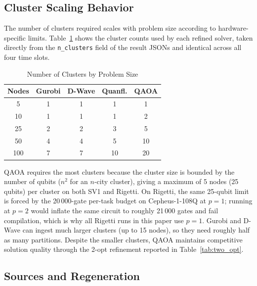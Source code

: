 \documentclass[conference]{IEEEtran}
\begin{document}
\subsection{Cluster Scaling Behavior}

The number of clusters required scales with problem size according to hardware-specific limits. Table~\ref{tab:clusters} shows the cluster counts used by each refined solver, taken directly from the \texttt{n\_clusters} field of the result JSONs and identical across all four time slots.

\begin{table}[htbp]
\caption{Number of Clusters by Problem Size}
\begin{center}
\begin{tabular}{|c|c|c|c|c|}
\hline
\textbf{Nodes} & \textbf{Gurobi} & \textbf{D-Wave} & \textbf{Quanfl.} & \textbf{QAOA} \\
\hline
5   & 1 & 1 & 1  & 1  \\
\hline
10  & 1 & 1 & 1  & 2  \\
\hline
25  & 2 & 2 & 3  & 5  \\
\hline
50  & 4 & 4 & 5  & 10 \\
\hline
100 & 7 & 7 & 10 & 20 \\
\hline
\end{tabular}
\label{tab:clusters}
\end{center}
\end{table}

QAOA requires the most clusters because the cluster size is bounded by the number of qubits ($n^2$ for an $n$-city cluster), giving a maximum of 5 nodes (25 qubits) per cluster on both SV1 and Rigetti. On Rigetti, the same 25-qubit limit is forced by the 20\,000-gate per-task budget on Cepheus-1-108Q at $p=1$; running at $p=2$ would inflate the same circuit to roughly 21\,000 gates and fail compilation, which is why all Rigetti runs in this paper use $p=1$. Gurobi and D-Wave can ingest much larger clusters (up to 15 nodes), so they need roughly half as many partitions. Despite the smaller clusters, QAOA maintains competitive solution quality through the 2-opt refinement reported in Table~\ref{tab:two_opt}.

\subsection{Sources and Regeneration}
\end{document}
